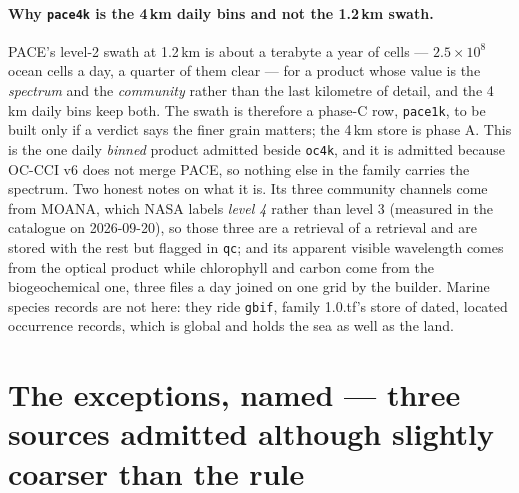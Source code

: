 \documentclass[10pt]{article}
\newcommand{\code}[1]{\texttt{#1}}
\begin{document}
\paragraph{Why \code{pace4k} is the 4\,km daily bins and not the 1.2\,km
swath.} PACE's level-2 swath at 1.2\,km is about a terabyte a year of cells
--- $2.5 \times 10^8$ ocean cells a day, a quarter of them clear --- for a
product whose value is the \emph{spectrum} and the \emph{community} rather
than the last kilometre of detail, and the 4\,km daily bins keep both. The
swath is therefore a phase-C row, \code{pace1k}, to be built only if a
verdict says the finer grain matters; the 4\,km store is phase A. This is
the one daily \emph{binned} product admitted beside \code{oc4k}, and it is
admitted because OC-CCI v6 does not merge PACE, so nothing else in the
family carries the spectrum. Two honest notes on what it is. Its three
community channels come from MOANA, which NASA labels \emph{level 4} rather
than level 3 (measured in the catalogue on 2026-09-20), so those three are a
retrieval of a retrieval and are stored with the rest but flagged in
\code{qc}; and its apparent visible wavelength comes from the optical
product while chlorophyll and carbon come from the biogeochemical one, three
files a day joined on one grid by the builder. Marine species records are
not here: they ride \code{gbif}, family 1.0.tf's store of dated, located
occurrence records, which is global and holds the sea as well as the land.

\clearpage
\section{The exceptions, named --- three sources admitted although slightly coarser than the rule}
\end{document}

